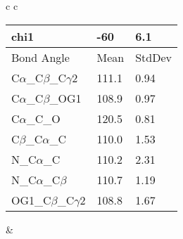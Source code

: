 \begin{longtable}{ c c }
\begin{tabular}{ l l l }
  chi1 & -60 & 6.1 \\ \midrule
  Bond Angle   & Mean     & StdDev \\ \midrule
  C$\alpha$\_C$\beta$\_C$\gamma$2 & 111.1 & 0.94\\
  C$\alpha$\_C$\beta$\_OG1 & 108.9 & 0.97\\
  C$\alpha$\_C\_O & 120.5 & 0.81\\
  C$\beta$\_C$\alpha$\_C & 110.0 & 1.53\\
  N\_C$\alpha$\_C & 110.2 & 2.31\\
  N\_C$\alpha$\_C$\beta$ & 110.7 & 1.19\\
  OG1\_C$\beta$\_C$\gamma$2 & 108.8 & 1.67\\
  \bottomrule
  \end{tabular}
  &
  \\
  
\end{longtable}

\newpage

